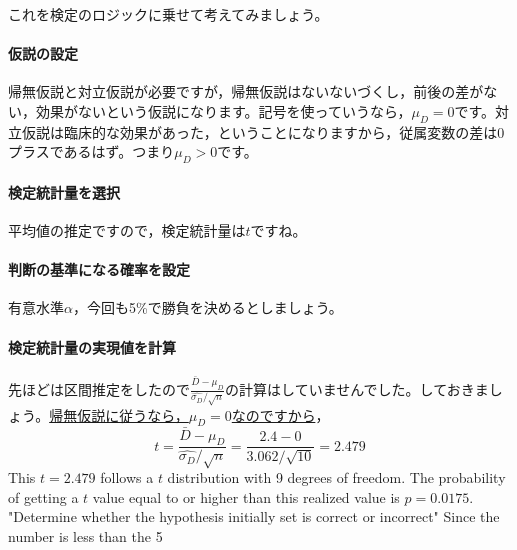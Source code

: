 \documentclass{ltjsarticle}
\begin{document}
これを検定のロジックに乗せて考えてみましょう。
\paragraph{仮説の設定}帰無仮説と対立仮説が必要ですが，帰無仮説はないないづくし，前後の差がない，効果がないという仮説になります。記号を使っていうなら，$\mu_D=0$です。対立仮説は臨床的な効果があった，ということになりますから，従属変数の差は0プラスであるはず。つまり$\mu_D > 0$です。
\paragraph{検定統計量を選択}平均値の推定ですので，検定統計量は$t$ですね。
\paragraph{判断の基準になる確率を設定}有意水準$\alpha$，今回も5\%で勝負を決めるとしましょう。
\paragraph{検定統計量の実現値を計算}先ほどは区間推定をしたので$\frac{\bar{D}-\mu_D}{\hat{\sigma_D}/\sqrt{n}} $の計算はしていませんでした。しておきましょう。\underline{帰無仮説に従うなら，$\mu_D=0$なのですから}，
\[t= \frac{\bar{D}-\mu_D}{\hat{\sigma_D}/\sqrt{n}}  = \frac{2.4-0}{3.062/\sqrt{10}}  = 2.479\]
This $t = 2.479$ follows a $t$ distribution with 9 degrees of freedom. The probability of getting a $t$ value equal to or higher than this realized value is $p = 0.0175$.
"Determine whether the hypothesis initially set is correct or incorrect"
Since the number is less than the 5%
\end{document}
